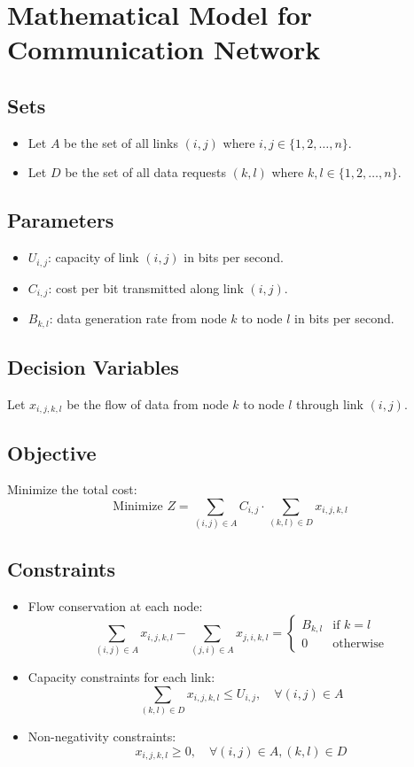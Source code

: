 \documentclass{article}
\begin{document}
\section*{Mathematical Model for Communication Network}

\subsection*{Sets}
\begin{itemize}
    \item Let $A$ be the set of all links $(i,j)$ where $i, j \in \{1, 2, \ldots, n\}$.
    \item Let $D$ be the set of all data requests $(k,l)$ where $k, l \in \{1, 2, \ldots, n\}$.
\end{itemize}

\subsection*{Parameters}
\begin{itemize}
    \item $U_{i,j}$: capacity of link $(i,j)$ in bits per second.
    \item $C_{i,j}$: cost per bit transmitted along link $(i,j)$.
    \item $B_{k,l}$: data generation rate from node $k$ to node $l$ in bits per second.
\end{itemize}

\subsection*{Decision Variables}
Let $x_{i,j,k,l}$ be the flow of data from node $k$ to node $l$ through link $(i,j)$.

\subsection*{Objective}
Minimize the total cost:
\[
\text{Minimize } Z = \sum_{(i,j) \in A} C_{i,j} \cdot \sum_{(k,l) \in D} x_{i,j,k,l}
\]

\subsection*{Constraints}
\begin{itemize}
    \item Flow conservation at each node:
    \[
    \sum_{(i,j) \in A} x_{i,j,k,l} - \sum_{(j,i) \in A} x_{j,i,k,l} = 
    \begin{cases}
        B_{k,l} & \text{if } k=l \\
        0 & \text{otherwise}
    \end{cases}
    \]
    \item Capacity constraints for each link:
    \[
    \sum_{(k,l) \in D} x_{i,j,k,l} \leq U_{i,j}, \quad \forall (i,j) \in A
    \]
    \item Non-negativity constraints:
    \[
    x_{i,j,k,l} \geq 0, \quad \forall (i,j) \in A, (k,l) \in D
    \]
\end{itemize}
\end{document}
